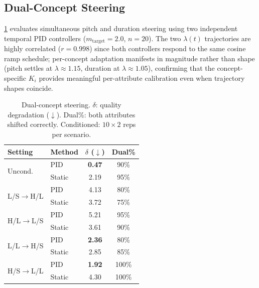 \documentclass{article}
\theoremstyle{plain}
\begin{document}
\subsection{Dual-Concept Steering}
\label{sec:dual}

\cref{tab:dual} evaluates simultaneous pitch and duration steering using two independent temporal PID controllers ($m_\text{target}{=}2.0$, $n{=}20$). The two $\lambda(t)$ trajectories are highly correlated ($r{=}0.998$) since both controllers respond to the same cosine ramp schedule; per-concept adaptation manifests in magnitude rather than shape (pitch settles at $\lambda{\approx}1.15$, duration at $\lambda{\approx}1.05$), confirming that the concept-specific $K_i$ provides meaningful per-attribute calibration even when trajectory shapes coincide.

\begin{table}[t]
  \caption{Dual-concept steering. $\delta$: quality degradation ($\downarrow$). Dual\%: both attributes shifted correctly. Conditioned: $10{\times}2$ reps per scenario.}
  \label{tab:dual}
  \begin{center}
  \begin{small}
  \begin{tabular}{llcc}
    \toprule
    Setting & Method & $\delta$ ($\downarrow$) & Dual\% \\
    \midrule
    \multirow{2}{*}{Uncond.} & PID & \textbf{0.47} & 90\% \\
    & Static & 2.19 & 95\% \\
    \midrule
    \multirow{2}{*}{L/S$\to$H/L} & PID & 4.13 & 80\% \\
    & Static & 3.72 & 75\% \\
    \multirow{2}{*}{H/L$\to$L/S} & PID & 5.21 & 95\% \\
    & Static & 3.61 & 90\% \\
    \multirow{2}{*}{L/L$\to$H/S} & PID & \textbf{2.36} & 80\% \\
    & Static & 2.85 & 85\% \\
    \multirow{2}{*}{H/S$\to$L/L} & PID & \textbf{1.92} & 100\% \\
    & Static & 4.30 & 100\% \\
    \bottomrule
  \end{tabular}
  \end{small}
  \end{center}
  \vskip -0.1in
\end{table}
\end{document}
